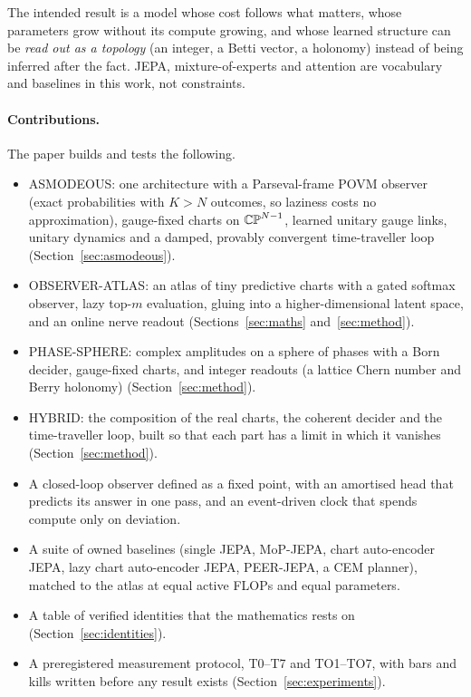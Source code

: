 The intended result is a model whose cost follows what matters, whose parameters grow without its compute growing, and whose learned structure can be \emph{read out as a topology} (an integer, a Betti vector, a holonomy) instead of being inferred after the fact. JEPA, mixture-of-experts and attention are vocabulary and baselines in this work, not constraints.

\paragraph{Contributions.} The paper builds and tests the following.
\begin{itemize}
  \item ASMODEOUS: one architecture with a Parseval-frame POVM observer (exact probabilities with $K>N$ outcomes, so laziness costs no approximation), gauge-fixed charts on $\mathbb{CP}^{N-1}$, learned unitary gauge links, unitary dynamics and a damped, provably convergent time-traveller loop (Section~\ref{sec:asmodeous}).
  \item OBSERVER-ATLAS: an atlas of tiny predictive charts with a gated softmax observer, lazy top-$m$ evaluation, gluing into a higher-dimensional latent space, and an online nerve readout (Sections~\ref{sec:maths} and~\ref{sec:method}).
  \item PHASE-SPHERE: complex amplitudes on a sphere of phases with a Born decider, gauge-fixed charts, and integer readouts (a lattice Chern number and Berry holonomy) (Section~\ref{sec:method}).
  \item HYBRID: the composition of the real charts, the coherent decider and the time-traveller loop, built so that each part has a limit in which it vanishes (Section~\ref{sec:method}).
  \item A closed-loop observer defined as a fixed point, with an amortised head that predicts its answer in one pass, and an event-driven clock that spends compute only on deviation.
  \item A suite of owned baselines (single JEPA, MoP-JEPA, chart auto-encoder JEPA, lazy chart auto-encoder JEPA, PEER-JEPA, a CEM planner), matched to the atlas at equal active FLOPs and equal parameters.
  \item A table of verified identities that the mathematics rests on (Section~\ref{sec:identities}).
  \item A preregistered measurement protocol, T0--T7 and TO1--TO7, with bars and kills written before any result exists (Section~\ref{sec:experiments}).
\end{itemize}
